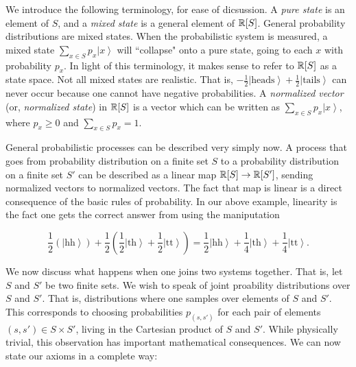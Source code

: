 \documentclass{article}
\theoremstyle{definition}
\numberwithin{figure}{section}
\begin{document}
We introduce the following terminology, for ease of dicsussion. A \textit{pure state} is an element of $S$, and a \textit{mixed state} is a general element of $\mathbb{R}[S]$. General probability distributions are mixed states. When the probabilistic system is measured, a mixed state $\sum_{x\in S}p_x\left| x\right>$ will ``collapse" onto a pure state, going to each $x$ with probability $p_x$. In light of this terminology, it makes sense to refer to $\mathbb{R}[S]$ as a state space. Not all mixed states are realistic. That is, $-\frac{1}{2}\left|\text{heads}\right>+\frac{1}{2}\left|\text{tails}\right>$ can never occur because one cannot have negative probabilities. A \textit{normalized vector} (or, \textit{normalized state}) in $\mathbb{R}[S]$ is a vector which can be written as $\sum_{x\in S}p_x \left |x \right>$, where $p_x\geq 0$ and $\sum_{x\in S}p_x=1$.

General probabilistic processes can be described very simply now. A process that goes from probability distribution on a finite set $S$ to a  probability distribution on a finite set $S'$ can be described as a linear map $\mathbb{R}[S]\to \mathbb{R}[S']$, sending normalized vectors to normalized vectors. The fact that map is linear is a direct consequence of the basic rules of probability. In our above example, linearity is the fact one gets the correct answer from using the maniputation


$$\frac{1}{2}\left(\left|\text{hh}\right>\right)+\frac{1}{2}\left(\frac{1}{2}\left|\text{th}\right>+\frac{1}{2}\left|\text{tt}\right>\right)=\frac{1}{2}\left|\text{hh}\right>+\frac{1}{4}\left|\text{th}\right>+\frac{1}{4}\left|\text{tt}\right>.$$

We now discuss what happens when one joins two systems together. That is, let $S$ and $S'$ be two finite sets. We wish to speak of joint proability distributions over $S$ and $S'$. That is, distributions where one samples over elements of $S$ and $S'$. This corresponds to choosing probabilities $p_{(s,s')}$ for each pair of elements $(s,s')\in S\times S'$, living in the Cartesian product of $S$ and $S'$. While physically trivial, this observation has important mathematical consequences. We can now state our axioms in a complete way:
\end{document}
